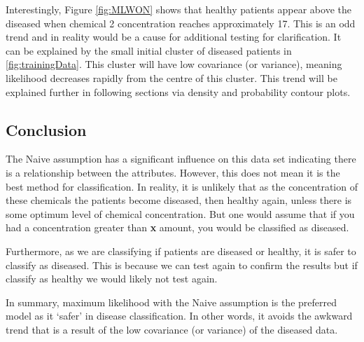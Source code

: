 {Interestingly, Figure \ref{fig:MLWON} shows that healthy patients appear above the diseased when chemical 2 concentration reaches approximately 17. This is an odd trend and in reality would be a cause for additional testing for clarification. It can be explained by the small initial cluster of diseased patients in \ref{fig:trainingData}. This cluster will have low covariance (or variance), meaning likelihood decreases rapidly from the centre of this cluster. This trend will be explained further in following sections via density and probability contour plots.

\subsection{Conclusion}
The Naive assumption has a significant influence on this data set indicating there is a relationship between the attributes. However, this does not mean it is the best method for classification. In reality, it is unlikely that as the concentration of these chemicals the patients become diseased, then healthy again, unless there is some optimum level of chemical concentration. But one would assume that if you had a concentration greater than \textbf{x} amount, you would be classified as diseased.

Furthermore, as we are classifying if patients are diseased or healthy, it is safer to classify as diseased. This is because we can test again to confirm the results but if classify as healthy we would likely not test again. 

In summary, maximum likelihood with the Naive assumption is the preferred model as it `safer' in disease classification. In other words, it avoids the awkward trend that is a result of the low covariance (or variance) of the diseased data.


}
